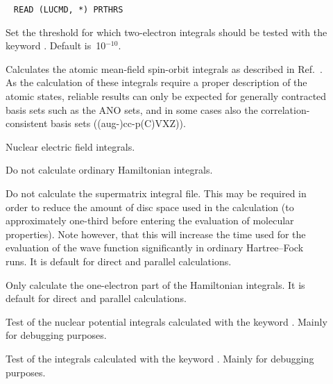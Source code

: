 \begin{description}
\item[]\verb| |\newline
\verb|READ (LUCMD, *) PRTHRS|

Set the threshold for which two-electron integrals should be tested
 with the keyword . Default is~10$^{-10}$.

\item[] Calculates the atomic mean-field spin-orbit
 integrals as described in Ref.~\cite{bahcmmuwogcpl251}. As the
 calculation of these 
 integrals require a proper description of the atomic states, reliable
 results can only be expected for generally contracted basis sets such
 as the ANO sets, and in some cases also the correlation-consistent
 basis sets ((aug-)cc-p(C)VXZ)).

\item[] Nuclear electric field integrals.


\item[] Do not calculate ordinary Hamiltonian integrals.

\item[] Do not calculate the supermatrix
integral file.
This may be required in order to reduce the amount of disc space used
in the calculation (to approximately one-third before entering the
evaluation of molecular properties).
Note however, that this will increase the time used for the evaluation
of the wave function
significantly in ordinary Hartree--Fock runs. It is default for direct and
parallel calculations.

\item[] Only calculate the one-electron part of the
Hamiltonian integrals. It is default for direct and parallel calculations.

\item[] Test of the nuclear potential integrals
calculated with the keyword . Mainly for debugging
purposes.

\item[] Test of the integrals calculated with the
keyword . Mainly for debugging purposes.


\end{description}
